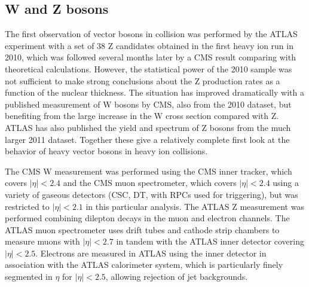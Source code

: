 \subsection{W and Z bosons}

The first observation of vector bosons in \PbPb collision was performed by the ATLAS
experiment with a set of 38 Z candidates obtained in the first heavy ion run in 2010, which
was followed several months later by a CMS result comparing with theoretical calculations.
However, the statistical power of the 2010 sample was not sufficient to make strong conclusions
about the Z production rates as a function of the nuclear thickness.
The situation has improved dramatically with a published measurement of W bosons by CMS, also from the
2010 dataset, but benefiting from the large increase in the W cross section compared with Z.
ATLAS has also published the yield and spectrum of Z bosons from the much larger 2011 \PbPb dataset.
Together these give a relatively complete first look at the behavior of heavy vector bosons in
heavy ion collisions.


The CMS W measurement was performed using the CMS inner tracker, which covers $|\eta|<2.4$
and the CMS muon spectrometer, which covers $|\eta|<2.4$ using a variety of gaseous detectors
(CSC, DT, with RPCs used for triggering), but was restricted to $|\eta|<2.1$ in this particular analysis.
The ATLAS Z measurement was performed combining dilepton decays in the muon and electron channels.
The ATLAS muon spectrometer uses drift tubes and cathode strip chambers to measure muons with $|\eta|<2.7$
in tandem with the ATLAS inner detector covering $|\eta|<2.5$.
Electrons are measured in ATLAS using the inner detector in association with the ATLAS calorimeter system,
which is particularly finely segmented in $\eta$ for $|\eta|<2.5$, allowing rejection of jet backgrounds.

